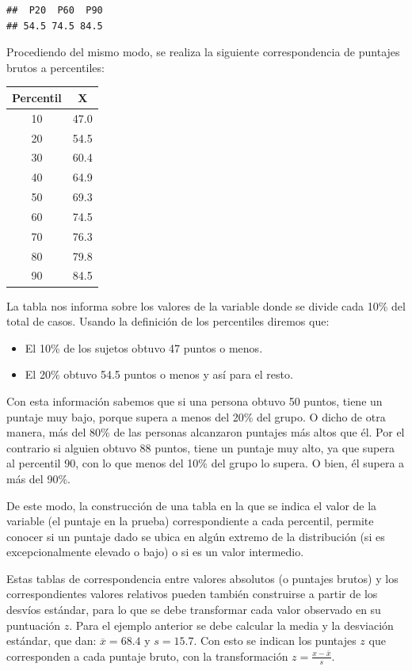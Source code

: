 \documentclass[]{book}
\providecommand{\tightlist}{%
  \setlength{\itemsep}{0pt}\setlength{\parskip}{0pt}}
\begin{document}
\begin{verbatim}
##  P20  P60  P90 
## 54.5 74.5 84.5
\end{verbatim}

Procediendo del mismo modo, se realiza la siguiente correspondencia de puntajes brutos a percentiles:

\begin{longtable}[]{@{}cc@{}}
\toprule
Percentil & X\tabularnewline
\midrule
\endhead
10 & 47.0\tabularnewline
20 & 54.5\tabularnewline
30 & 60.4\tabularnewline
40 & 64.9\tabularnewline
50 & 69.3\tabularnewline
60 & 74.5\tabularnewline
70 & 76.3\tabularnewline
80 & 79.8\tabularnewline
90 & 84.5\tabularnewline
\bottomrule
\end{longtable}

La tabla nos informa sobre los valores de la variable donde se divide
cada 10\% del total de casos. Usando la definición de los percentiles
diremos que:

\begin{itemize}
\tightlist
\item
  El 10\% de los sujetos obtuvo 47 puntos o menos.
\item
  El 20\% obtuvo 54.5 puntos o menos y así para el resto.
\end{itemize}

Con esta información sabemos que si una persona obtuvo 50 puntos, tiene
un puntaje muy bajo, porque supera a menos del 20\% del grupo. O dicho de
otra manera, más del 80\% de las personas alcanzaron puntajes más altos
que él. Por el contrario si alguien obtuvo 88 puntos, tiene un puntaje
muy alto, ya que supera al percentil 90, con lo que menos del 10\% del
grupo lo supera. O bien, él supera a más del 90\%.

De este modo, la construcción de una tabla en la que se indica el valor
de la variable (el puntaje en la prueba) correspondiente a cada
percentil, permite conocer si un puntaje dado se ubica en algún extremo
de la distribución (si es excepcionalmente elevado o bajo) o si es un
valor intermedio.

Estas tablas de correspondencia entre valores absolutos (o puntajes
brutos) y los correspondientes valores relativos pueden también
construirse a partir de los desvíos estándar, para lo que se debe
transformar cada valor observado en su puntuación \(z\). Para el ejemplo
anterior se debe calcular la media y la desviación estándar, que dan:
\(\overline{x} = 68.4\) y \(s = 15.7\). Con esto se indican los puntajes \(z\)
que corresponden a cada puntaje bruto, con la transformación
\(z = \frac{x - \overline{x}}{s}\).
\end{document}
